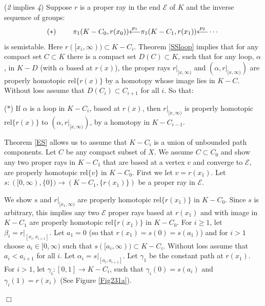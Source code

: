\documentclass[12pt]{article}
\newenvironment{proof}{\addvspace{12pt}\noindent{\bf Proof:}}{
$\Box$\par\addvspace{12pt}}
\begin{document}

\begin{proof} ({\it 2} implies {\it 4}) 
Suppose  $r$ is a proper ray in the end $\mathcal E$ of $K$ and the inverse sequence of groups:
 $$(\ast) \ \ \ \ \ \ \ \pi_1(K-C_0,r(x_0)){\buildrel p_1\over \longleftarrow}\pi_1(K-C_1,r(x_1)) {\buildrel p_2\over \longleftarrow}\cdots$$ 
 is semistable. Here $r([x_i,\infty))\subset K-C_{i}$. Theorem \ref{SSloop} implies that  
for  any  compact set  $C\subset K$ there is a compact set $D(C)\subset K$, such that  for any %
loop, $\alpha$,  in $K - D$ (with $\alpha$  based at  $r(x)$),  the proper rays $r|_{[x,\infty)}$ and $(\alpha,r|_{[x,\infty)})$ are properly homotopic rel$\{r(x)\}$ %
by  a homotopy whose image lies in $K - C$. 
Without loss  assume that  $D(C_i)\subset C_{i+1}$ for all $i$. So that: 

\medskip

\noindent ($\ast$) If $\alpha$ is a loop in  $K - C_i$, based at  $r(x)$,  then $r|_{[x,\infty)}$ is properly homotopic rel$\{r(x)\}$ to $(\alpha, r|_{[x,\infty)})$, by a homotopy in $K- C_{i-1}$. 

\medskip

Theorem \ref{ES} allows us to assume that $K-C_i$ is a union of unbounded path components. Let $C$ be any compact subset of $X$. We assume $C\subset C_0$ and show any two proper rays in $K-C_1$ that are based at a vertex $v$ and converge to $\mathcal E$, are properly homotopic rel$\{v\}$ in $K-C_0$. First we let $v=r(x_1)$.  Let  $s:  ([0, \infty),\{0\}) \to (K-C_1, \{r(x_1)\})$ be  a  proper ray in $\mathcal E$. 
  
We show $s$ and  $r|_{[x_1,\infty)}$ are properly homotopic rel$\{r(x_1)\}$ in $K-C_0$. Since $s$ is arbitrary, this implies any two $\mathcal E$ proper rays based at $r(x_1)$ and with image in $K-C_1$ are properly homotopic rel$\{r(x_1)\}$ in $K-C_0$. For $i\geq 1$, let $\beta_i=r|_{[x_i,x_{i+1}]}$. Let $a_1=0$ (so that $r(x_1)=s(0)=s(a_1)$) and for $i>1$ choose $a_i\in [0, \infty)$ such that  $s([a_i, \infty)) \subset  K-C_i$. Without loss assume that  $a_i <  a_{i+1}$ for  all $i$. Let $\alpha_i=s|_{[a_{i},a_{i+1}]}$.   Let  $\gamma_1$ be the constant path at $r(x_1)$. For $i>1$, let
$\gamma_i: [0,1] \to  K-C_i$, such that  $\gamma_i(0) = s(a_i)$ and  $\gamma_i(1) = r(x_i)$ (See Figure \ref{Fig231a}).   
  

\end{proof}
\end{document}
